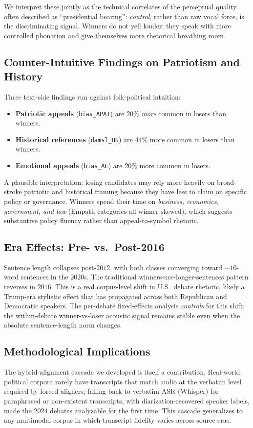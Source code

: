\documentclass[journal]{IEEEtran}
\begin{document}
We interpret these jointly as the technical correlates of the
perceptual quality often described as ``presidential bearing'':
\emph{control}, rather than raw vocal force, is the discriminating
signal. Winners do not yell louder; they speak with more
controlled phonation and give themselves more rhetorical breathing
room.

\subsection{Counter-Intuitive Findings on Patriotism and History}
Three text-side findings run against folk-political intuition:

\begin{itemize}
  \item \textbf{Patriotic appeals} (\texttt{bias\_APAT}) are
        $20\%$ \emph{more} common in losers than winners.
  \item \textbf{Historical references} (\texttt{damsl\_HS}) are
        $44\%$ more common in losers than winners.
  \item \textbf{Emotional appeals} (\texttt{bias\_AE}) are
        $20\%$ more common in losers.
\end{itemize}

A plausible interpretation: losing candidates may rely more heavily on
broad-stroke patriotic and historical framing because they have less
to claim on specific policy or governance. Winners spend their
time on \emph{business, economics, government, and law}
(Empath categories all winner-skewed), which suggests substantive
policy fluency rather than appeal-to-symbol rhetoric.

\subsection{Era Effects: Pre- vs.\ Post-2016}
Sentence length collapses post-$2012$, with both classes converging
toward $\sim 10$-word sentences in the $2020$s. The traditional
winners-use-longer-sentences pattern reverses in $2016$. This is a
real corpus-level shift in U.S.\ debate rhetoric, likely a Trump-era
stylistic effect that has propagated across both Republican and
Democratic speakers. The per-debate fixed-effects analysis
\emph{controls} for this shift; the within-debate winner-vs-loser
acoustic signal remains stable even when the absolute sentence-length
norm changes.

\subsection{Methodological Implications}
The hybrid alignment cascade we developed is itself a contribution.
Real-world political corpora rarely have transcripts that match
audio at the verbatim level required by forced aligners; falling
back to verbatim ASR (Whisper) for paraphrased or non-existent
transcripts, with diarization-recovered speaker labels, made the
$2024$ debates analyzable for the first time. This cascade
generalizes to any multimodal corpus in which transcript fidelity
varies across source eras.
\end{document}
